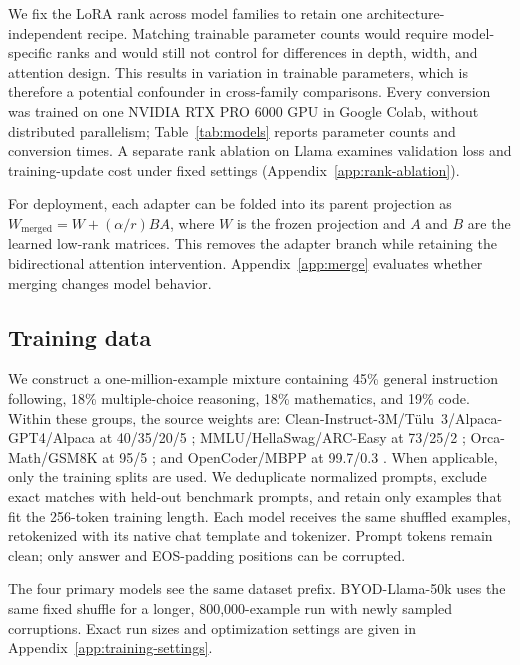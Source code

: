 \documentclass{article}
\begin{document}
We fix the LoRA rank across model families to retain one architecture-independent recipe. Matching trainable parameter counts would require model-specific ranks and would still not control for differences in depth, width, and attention design. This results in variation in trainable parameters, which is therefore a potential confounder in cross-family comparisons. Every conversion was trained on one NVIDIA RTX PRO 6000 GPU in Google Colab, without distributed parallelism; Table~\ref{tab:models} reports parameter counts and conversion times. A separate rank ablation on Llama examines validation loss and training-update cost under fixed settings (Appendix~\ref{app:rank-ablation}).

For deployment, each adapter can be folded into its parent projection as $W_{\mathrm{merged}}=W+(\alpha/r)BA$, where $W$ is the frozen projection and $A$ and $B$ are the learned low-rank matrices. This removes the adapter branch while retaining the bidirectional attention intervention. Appendix~\ref{app:merge} evaluates whether merging changes model behavior.

\subsection{Training data}

We construct a one-million-example mixture containing 45\% general instruction following, 18\% multiple-choice reasoning, 18\% mathematics, and 19\% code. Within these groups, the source weights are: Clean-Instruct-3M/T\"ulu~3/Alpaca-GPT4/Alpaca at 40/35/20/5 \citep{cleaninstruct3m,lambert2024tulu3,peng2023instructiongpt4,taori2023alpaca}; MMLU/HellaSwag/ARC-Easy at 73/25/2 \citep{hendrycks2021mmlu,zellers2019hellaswag,clark2018arc}; Orca-Math/GSM8K at 95/5 \citep{mitra2024orcamath,cobbe2021gsm8k}; and OpenCoder/MBPP at 99.7/0.3 \citep{huang2024opencoder,austin2021mbpp}. When applicable, only the training splits are used. We deduplicate normalized prompts, exclude exact matches with held-out benchmark prompts, and retain only examples that fit the 256-token training length. Each model receives the same shuffled examples, retokenized with its native chat template and tokenizer. Prompt tokens remain clean; only answer and EOS-padding positions can be corrupted.

The four primary models see the same dataset prefix. BYOD-Llama-50k uses the same fixed shuffle for a longer, 800,000-example run with newly sampled corruptions. Exact run sizes and optimization settings are given in Appendix~\ref{app:training-settings}.
\end{document}
